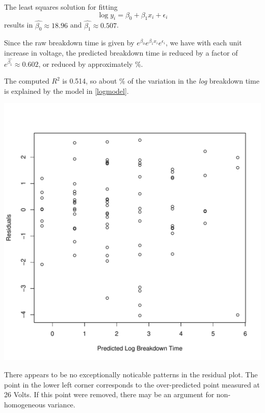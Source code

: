 \documentclass{homework}
\begin{document}
\begin{longproblem}
The least squares solution for fitting 
\begin{equation}
  \log y_i = \beta_0 + \beta_1 x_i + \epsilon_i\label{logmodel}
\end{equation}
results in $\hat{\beta_0} \approx18.96$ and $\hat{\beta_1}\approx0.507$. 


Since the raw breakdown time is given by $e^{\beta_0}e^{\beta_1 x_i}e^{\epsilon_i}$, we have with each unit increase in voltage, the predicted breakdown time is reduced by a factor of $e^{\hat{\beta_1}} \approx 0.602$, or reduced by approximately \unit[40]{\%}.


The computed $R^2$ is 0.514, so about \unit[51]{\%} of the variation in the \emph{log} breakdown time is explained by the model in \eqref{logmodel}.


\begin{minipage}{.35\textwidth}
\includegraphics[width=\textwidth]{residual_fluid.pdf}
\end{minipage}
\begin{minipage}{.55\textwidth}
There appears to be no exceptionally noticable patterns in the residual plot.  The point in the lower left corner corresponds to the over-predicted point measured at 26 Volts.  If this point were removed, there may be an argument for non-homogeneous variance. 
\end{minipage}


\end{longproblem}
\end{document}
